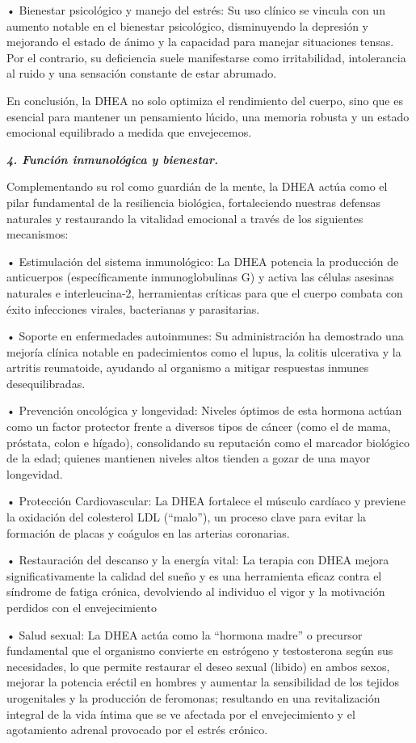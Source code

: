 \documentclass[
  spanish,
]{article}
\begin{document}
• Bienestar psicológico y manejo del estrés: Su uso clínico se vincula con un aumento notable en el bienestar psicológico, disminuyendo la depresión y mejorando el estado de ánimo y la capacidad para manejar situaciones tensas. Por el contrario, su deficiencia suele manifestarse como irritabilidad, intolerancia al ruido y una sensación constante de estar abrumado.

En conclusión, la DHEA no solo optimiza el rendimiento del cuerpo, sino que es esencial para mantener un pensamiento lúcido, una memoria robusta y un estado emocional equilibrado a medida que envejecemos.

\textbf{\emph{4. Función inmunológica y bienestar.}}

Complementando su rol como guardián de la mente, la DHEA actúa como el pilar fundamental de la resiliencia biológica, fortaleciendo nuestras defensas naturales y restaurando la vitalidad emocional a través de los siguientes mecanismos:

• Estimulación del sistema inmunológico: La DHEA potencia la producción de anticuerpos (específicamente inmunoglobulinas G) y activa las células asesinas naturales e interleucina-2, herramientas críticas para que el cuerpo combata con éxito infecciones virales, bacterianas y parasitarias.

• Soporte en enfermedades autoinmunes: Su administración ha demostrado una mejoría clínica notable en padecimientos como el lupus, la colitis ulcerativa y la artritis reumatoide, ayudando al organismo a mitigar respuestas inmunes desequilibradas.

• Prevención oncológica y longevidad: Niveles óptimos de esta hormona actúan como un factor protector frente a diversos tipos de cáncer (como el de mama, próstata, colon e hígado), consolidando su reputación como el marcador biológico de la edad; quienes mantienen niveles altos tienden a gozar de una mayor longevidad.

• Protección Cardiovascular: La DHEA fortalece el músculo cardíaco y previene la oxidación del colesterol LDL (``malo''), un proceso clave para evitar la formación de placas y coágulos en las arterias coronarias.

• Restauración del descanso y la energía vital: La terapia con DHEA mejora significativamente la calidad del sueño y es una herramienta eficaz contra el síndrome de fatiga crónica, devolviendo al individuo el vigor y la motivación perdidos con el envejecimiento

• Salud sexual: La DHEA actúa como la ``hormona madre'' o precursor fundamental que el organismo convierte en estrógeno y testosterona según sus necesidades, lo que permite restaurar el deseo sexual (libido) en ambos sexos, mejorar la potencia eréctil en hombres y aumentar la sensibilidad de los tejidos urogenitales y la producción de feromonas; resultando en una revitalización integral de la vida íntima que se ve afectada por el envejecimiento y el agotamiento adrenal provocado por el estrés crónico.
\end{document}
